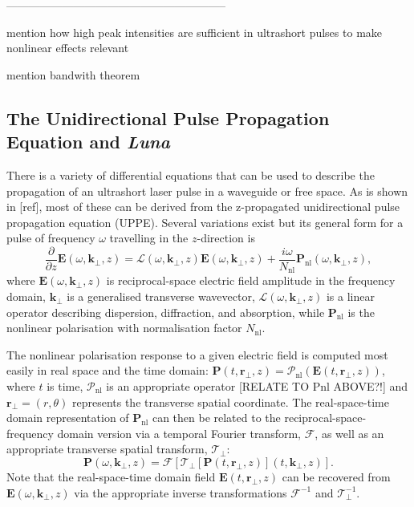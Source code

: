 \documentclass[a4paper]{jpconf}
\begin{document}
-----------------------------------------------------------

mention how high peak intensities are sufficient in ultrashort pulses to make nonlinear effects relevant 

mention bandwith theorem


\subsection{The Unidirectional Pulse Propagation Equation and \emph{Luna} }
There is a variety of differential equations that can be used to describe the propagation of an ultrashort laser pulse in a waveguide or free space. As is shown in [ref], most of these can be derived from the z-propagated unidirectional pulse propagation equation (UPPE). Several variations exist but its general form for a pulse of frequency $\omega$ travelling in the $z$-direction is 
\begin{equation}
\frac{\partial}{\partial z} \mathbf{E}(\omega, \mathbf{k}_\perp, z)= \mathcal{L}(\omega, \mathbf{k}_\perp, z)\mathbf{E}(\omega, \mathbf{k}_\perp, z) + \frac{i \omega}{N_{\text{nl}}} \mathbf{P}_\text{nl}(\omega, \mathbf{k}_\perp, z),
\end{equation}
where $\mathbf{E}(\omega, \mathbf{k}_\perp, z)$ is reciprocal-space electric field amplitude in the frequency domain, $\mathbf{k}_\perp$ is a generalised transverse wavevector,  $\mathcal{L}(\omega, \mathbf{k}_\perp, z)$ is a linear operator describing dispersion, diffraction, and absorption, while $\mathbf{P}_\text{nl}$ is the nonlinear polarisation with normalisation factor $N_\text{nl}$. \par 
The nonlinear polarisation response to a given electric field is computed most easily in real space and the time domain: $\mathbf{P}(t, \mathbf{r}_\perp,z) = \mathcal{P}_\text{nl}(\mathbf{E}(t,\mathbf{r}_\perp,z))$, where $t$ is time, $\mathcal{P}_\text{nl}$ is an appropriate operator [RELATE TO Pnl ABOVE?!] and $\mathbf{r}_\perp = (r, \theta)$ represents the transverse spatial coordinate. The real-space-time domain representation of $\mathbf{P}_\text{nl}$ can then be related to the reciprocal-space-frequency domain version via a temporal Fourier transform, $\mathcal{F}$, as well as an appropriate transverse spatial transform, $\mathcal{T}_\perp$:
\begin{equation}
\mathbf{P}(\omega, \mathbf{k}_\perp,z) = \mathcal{F}\left[ \mathcal{T}_\perp \left[ \mathbf{P}(t, \mathbf{r}_\perp,z) \right](t, \mathbf{k}_\perp, z)  \right]. 
\end{equation}
Note that the real-space-time domain field $\mathbf{E}(t, \mathbf{r}_\perp, z)$ can be recovered from $\mathbf{E}(\omega, \mathbf{k}_\perp, z)$ via the appropriate inverse transformations $\mathcal{F}^{-1}$ and $\mathcal{T}^{-1}_\perp$. \par 
\end{document}
